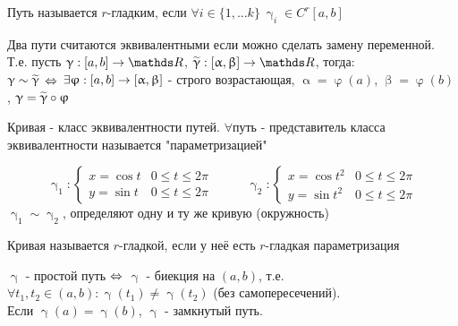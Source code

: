 \documentclass[matan]{subfiles}
\begin{document}
  \begin{definition}
      Путь называется $r$-гладким, если $\forall i \in \{1,...k\}\ \upgamma_i \in C^r[a,b]$
  \end{definition}

  \begin{definition}
      Два пути считаются эквивалентными если можно сделать замену переменной. Т.е. пусть $\upgamma: [a,b] \rightarrow \R$, $\w{\upgamma}: [\upalpha, \upbeta] \rightarrow \R$, тогда:
      \\
      $\upgamma \sim \widetilde{\upgamma}$ $\Leftrightarrow$ $\exists \upvarphi: [a,b] \rightarrow [\upalpha, \upbeta]$ - строго возрастающая, $\upalpha = \upvarphi (a)$, $\upbeta = \upvarphi (b)$, $\upgamma = \widetilde{\upgamma} \circ \upvarphi$
  \end{definition}

  \begin{definition}
      Кривая - класс эквивалентности путей. $\forall$путь - представитель класса эквивалентности называется "параметризацией"
  \end{definition}

  \begin{Example}
      \begin{equation*}
      \upgamma_1: \begin{cases}
         x = \cos t & 0 \leqslant t \leqslant 2 \pi\\
         y = \sin t & 0 \leqslant t \leqslant 2 \pi
      \end{cases}\ \ \ \ \ \ \ \ \ \ \ \
      \upgamma_2: \begin{cases}
         x = \cos t^2 & 0 \leqslant t \leqslant 2 \pi\\
         y = \sin t^2 & 0 \leqslant t \leqslant 2 \pi
       \end{cases}
      \end{equation*}
      $\upgamma_1 \sim \upgamma_2$, определяют одну и ту же кривую (окружность)
  \end{Example}

  \begin{definition}
      Кривая называется $r$-гладкой, если у неё есть $r$-гладкая параметризация
  \end{definition}

  \begin{definition}
      $\upgamma$ - простой путь $\Leftrightarrow$ $\upgamma$ - биекция на $(a,b)$, т.е. $\forall t_1, t_2 \in (a,b): \upgamma(t_1) \neq \upgamma(t_2)$ (без самопересечений). \\
  	Если $\upgamma(a) = \upgamma(b)$, $\upgamma$ - замкнутый путь.
  \end{definition}
\end{document}
